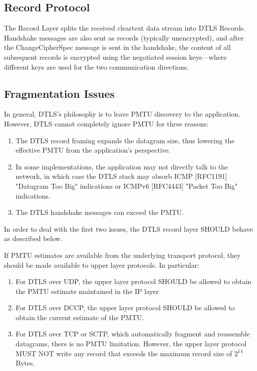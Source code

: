 \subsection{Record Protocol}
The Record Layer splits the received cleartext data stream into DTLS Records. Handshake messages are also sent as records (typically unencrypted), and after the ChangeCipherSpec message is sent in the handshake, the content of all subsequent records is encrypted using the negotiated session keys—where different keys are used for the two communication directions.



\subsection{Fragmentation Issues} \cite{rfc6347}
In general, DTLS's philosophy is to leave PMTU discovery to the
   application.  However, DTLS cannot completely ignore PMTU for three
   reasons:
\begin{enumerate}
    \item The DTLS record framing expands the datagram size, thus lowering
      the effective PMTU from the application's perspective.

   \item  In some implementations, the application may not directly talk to
      the network, in which case the DTLS stack may absorb ICMP
      [RFC1191] "Datagram Too Big" indications or ICMPv6 [RFC4443]
      "Packet Too Big" indications.

   \item The DTLS handshake messages can exceed the PMTU.
\end{enumerate}{}
 In order to deal with the first two issues, the DTLS record layer
   SHOULD behave as described below.


   If PMTU estimates are available from the underlying transport
   protocol, they should be made available to upper layer protocols.  In
   particular:
\begin{enumerate}
    \item For DTLS over UDP, the upper layer protocol SHOULD be allowed to obtain the PMTU estimate maintained in the IP layer.
      
    \item  For DTLS over DCCP, the upper layer protocol SHOULD be allowed to obtain the current estimate of the PMTU.

   \item For DTLS over TCP or SCTP, which automatically fragment and
      reassemble datagrams, there is no PMTU limitation.  However, the
      upper layer protocol MUST NOT write any record that exceeds the
      maximum record size of $2^{14}$ Bytes.
      
\end{enumerate}{}


